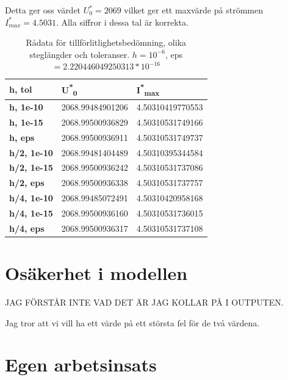\documentclass[a4paper, titlepage, 11pt]{article}
\begin{document}
Detta ger oss värdet $U_0^* = 2069$ vilket ger ett maxvärde på strömmen $I_{max}^* = 4.5031$. Alla siffror i dessa tal är korrekta.

\begin{table}[H]
\caption{Rådata för tillförlitlighetsbedömning, olika steglängder och toleranser. $h = 10^{-6}$, eps $= 2.220446049250313*10^{-16}$ }
\begin{center}
\begin{tabular}{l|ll}
\hline
{\color[HTML]{000000} \textbf{h, tol}}     & {\color[HTML]{000000} \textbf{U\textsuperscript{*}\textsubscript{0}}}     & {\color[HTML]{000000} \textbf{I\textsuperscript{*}\textsubscript{max}}}  \\ \hline
{\color[HTML]{000000} \textbf{h, 1e-10}}   & {\color[HTML]{000000} 2068.99484901206} & {\color[HTML]{000000} 4.50310419770553} \\
{\color[HTML]{000000} \textbf{h, 1e-15}}   & {\color[HTML]{000000} 2068.99500936829} & {\color[HTML]{000000} 4.50310531749166} \\
{\color[HTML]{000000} \textbf{h, eps}}     & {\color[HTML]{000000} 2068.99500936911} & {\color[HTML]{000000} 4.50310531749737} \\ \hline
{\color[HTML]{000000} \textbf{h/2, 1e-10}} & {\color[HTML]{000000} 2068.99481404489} & {\color[HTML]{000000} 4.50310395344584} \\
{\color[HTML]{000000} \textbf{h/2, 1e-15}} & {\color[HTML]{000000} 2068.99500936242} & {\color[HTML]{000000} 4.50310531737086} \\
{\color[HTML]{000000} \textbf{h/2, eps}}   & {\color[HTML]{000000} 2068.99500936338} & {\color[HTML]{000000} 4.50310531737757} \\ \hline
{\color[HTML]{000000} \textbf{h/4, 1e-10}} & {\color[HTML]{000000} 2068.99485072491} & {\color[HTML]{000000} 4.50310420958168} \\
{\color[HTML]{000000} \textbf{h/4, 1e-15}} & {\color[HTML]{000000} 2068.99500936160} & {\color[HTML]{000000} 4.50310531736015} \\
{\color[HTML]{000000} \textbf{h/4, eps}}   & {\color[HTML]{000000} 2068.99500936317} & {\color[HTML]{000000} 4.50310531737108}
\end{tabular}
\end{center}
\end{table}




\section{Osäkerhet i modellen}
JAG FÖRSTÅR INTE VAD DET ÄR JAG KOLLAR PÅ I OUTPUTEN.

Jag tror att vi vill ha ett värde på ett största fel för de två värdena.



\section{Egen arbetsinsats}
\end{document}
